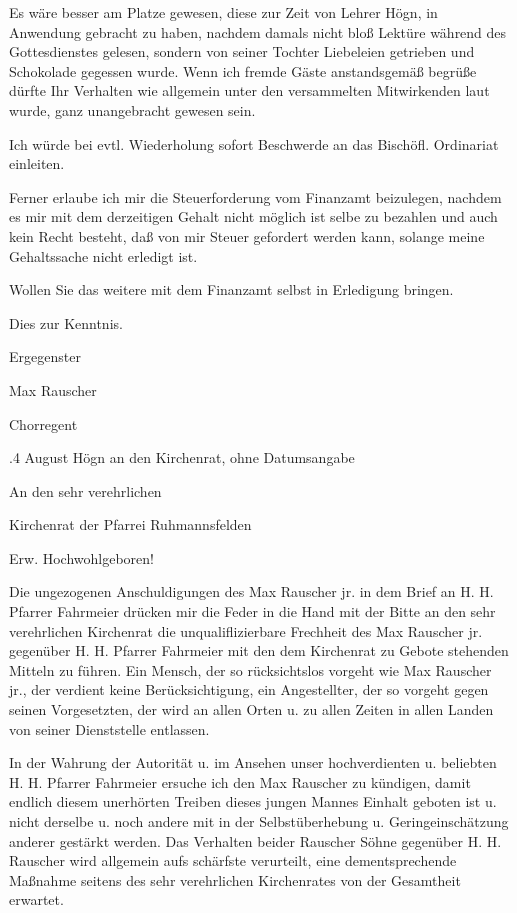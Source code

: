 \documentclass[12pt,a4paper]{book}
\begin{document}
Es wäre besser am Platze gewesen, diese zur Zeit von Lehrer Högn, in Anwendung
gebracht zu haben, nachdem damals nicht bloß Lektüre während des Gottesdienstes
gelesen, sondern von seiner Tochter Liebeleien getrieben und Schokolade gegessen
wurde. Wenn ich fremde Gäste anstandsgemäß begrüße dürfte Ihr Verhalten wie
allgemein unter den versammelten Mitwirkenden laut wurde, ganz unangebracht
gewesen sein.

Ich würde bei evtl. Wiederholung sofort Beschwerde an das Bischöfl. Ordinariat
einleiten.

Ferner erlaube ich mir die Steuerforderung vom Finanzamt beizulegen, nachdem es
mir mit dem derzeitigen Gehalt nicht möglich ist selbe zu bezahlen und auch kein
Recht besteht, daß von mir Steuer gefordert werden kann, solange meine
Gehaltssache nicht erledigt ist.

Wollen Sie das weitere mit dem Finanzamt selbst in Erledigung bringen.



Dies zur Kenntnis.



    Ergegenster



        Max Rauscher

            Chorregent

.4 August Högn an den Kirchenrat, ohne Datumsangabe



An den sehr verehrlichen

Kirchenrat der Pfarrei Ruhmannsfelden



Erw. Hochwohlgeboren!



Die ungezogenen Anschuldigungen des Max Rauscher jr. in dem Brief an H. H.
Pfarrer Fahrmeier drücken mir die Feder in die Hand mit der Bitte an den sehr
verehrlichen Kirchenrat die unqualiflizierbare Frechheit des Max Rauscher jr.
gegenüber H. H. Pfarrer Fahrmeier mit den dem Kirchenrat zu Gebote stehenden
Mitteln zu führen. Ein Mensch, der so rücksichtslos vorgeht wie Max Rauscher
jr., der verdient keine Berücksichtigung, ein Angestellter, der so vorgeht gegen
seinen Vorgesetzten, der wird an allen Orten u. zu allen Zeiten in allen Landen
von seiner Dienststelle entlassen.

In der Wahrung der Autorität u. im Ansehen unser hochverdienten u. beliebten H.
H. Pfarrer Fahrmeier ersuche ich den Max Rauscher zu kündigen, damit endlich
diesem unerhörten Treiben dieses jungen Mannes Einhalt geboten ist u. nicht
derselbe u. noch andere mit in der Selbstüberhebung u. Geringeinschätzung
anderer gestärkt werden. Das Verhalten beider Rauscher Söhne gegenüber H. H.
Rauscher wird allgemein aufs schärfste verurteilt, eine dementsprechende
Maßnahme seitens des sehr verehrlichen Kirchenrates von der Gesamtheit erwartet.
\end{document}
